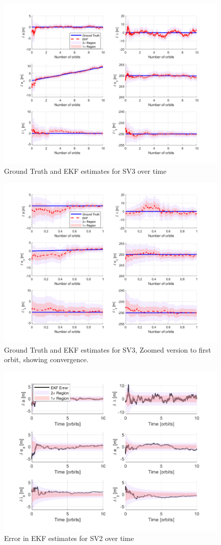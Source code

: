 \begin{figure}[H]
    \centering
    \includegraphics[width=0.7\linewidth]{sim/figures/PS8/ROE_over_time_SV3_comparison.png}
    \caption{Ground Truth and EKF estimates for SV3 over time}
    \label{fig:sv3_ekf_estimates}
\end{figure}

\begin{figure}[H]
    \centering
    \includegraphics[width=0.7\linewidth]{sim/figures/PS8/ROE_over_time_SV3_comparison_zoomed.png}
    \caption{Ground Truth and EKF estimates for SV3, Zoomed version to first orbit, showing convergence.}
    \label{fig:sv3_ekf_estimates_zoom}
\end{figure}

\begin{figure}[H]
    \centering
    \includegraphics[width=0.7\linewidth]{sim/figures/PS8/EKF_error_SV2.png}
    \caption{Error in EKF estimates for SV2 over time}
    \label{fig:sv2_ekf_error}
\end{figure}

